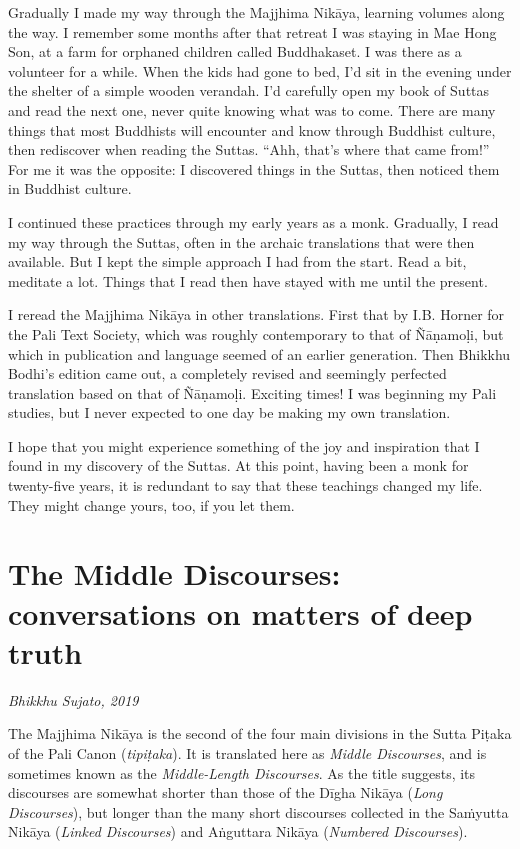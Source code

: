 \documentclass[12pt,openany]{book}%
\newcommand*{\scbyline}[1]{\begin{flushright}\textit{#1}\end{flushright}\bigskip}
\begin{document}
Gradually I made my way through the Majjhima \textsanskrit{Nikāya}, learning volumes along the way. I remember some months after that retreat I was staying in Mae Hong Son, at a farm for orphaned children called Buddhakaset. I was there as a volunteer for a while. When the kids had gone to bed, I’d sit in the evening under the shelter of a simple wooden verandah. I’d carefully open my book of Suttas and read the next one, never quite knowing what was to come. There are many things that most Buddhists will encounter and know through Buddhist culture, then rediscover when reading the Suttas. “Ahh, that’s where that came from!” For me it was the opposite: I discovered things in the Suttas, then noticed them in Buddhist culture.

I continued these practices through my early years as a monk. Gradually, I read my way through the Suttas, often in the archaic translations that were then available. But I kept the simple approach I had from the start. Read a bit, meditate a lot. Things that I read then have stayed with me until the present.

I reread the Majjhima \textsanskrit{Nikāya} in other translations. First that by I.B. Horner for the Pali Text Society, which was roughly contemporary to that of \textsanskrit{Ñāṇamoḷi}, but which in publication and language seemed of an earlier generation. Then Bhikkhu Bodhi’s edition came out, a completely revised and seemingly perfected translation based on that of \textsanskrit{Ñāṇamoḷi}. Exciting times! I was beginning my Pali studies, but I never expected to one day be making my own translation.

I hope that you might experience something of the joy and inspiration that I found in my discovery of the Suttas. At this point, having been a monk for twenty-five years, it is redundant to say that these teachings changed my life. They might change yours, too, if you let them.

%
\chapter*{The Middle Discourses: conversations on matters of deep truth}

\scbyline{Bhikkhu Sujato, 2019}

The Majjhima \textsanskrit{Nikāya} is the second of the four main divisions in the Sutta \textsanskrit{Piṭaka} of the Pali Canon (\textit{\textsanskrit{tipiṭaka}}). It is translated here as \textit{Middle Discourses}, and is sometimes known as the \textit{Middle-Length Discourses}. As the title suggests, its discourses are somewhat shorter than those of the \textsanskrit{Dīgha} \textsanskrit{Nikāya} (\textit{Long Discourses}), but longer than the many short discourses collected in the \textsanskrit{Saṁyutta} \textsanskrit{Nikāya} (\textit{Linked Discourses}) and \textsanskrit{Aṅguttara} \textsanskrit{Nikāya} (\textit{Numbered Discourses}).
\end{document}
